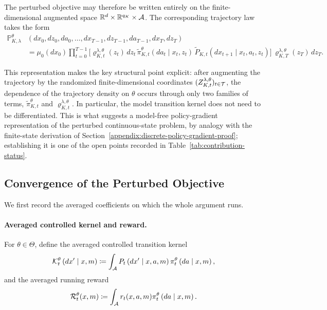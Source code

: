The perturbed objective may therefore be written entirely on the finite-dimensional augmented space $\mathbb{R}^d \times \mathbb{R}^{q_K} \times {\cal A}$. The corresponding trajectory law takes the form
\begin{align}
    \mathbb P_{K,\lambda}^{\theta} &(dx_0,dz_0,da_0,\ldots, dx_{T-1},dz_{T-1},da_{T-1},dx_T,dz_T) \nonumber\\ &= \mu_0(dx_0) \prod_{t=0}^{T-1} \Big[ \varrho_{K,t}^{\lambda,\theta}(z_t)\,dz_t\, \widetilde\pi_{K,t}^{\theta}(da_t\mid x_t,z_t)\, \widetilde P_{K,t}(dx_{t+1}\mid x_t,a_t,z_t) \Big] \, \varrho_{K,T}^{\lambda,\theta}(z_T)\,dz_T.
    \label{eq:gmm-augmented-trajectory-law}
\end{align}

This representation makes the key structural point explicit: after augmenting the trajectory by the randomized finite-dimensional coordinates $(Z_{K,t}^{\lambda,\theta})_{t\in{\cal T}}$, the dependence of the trajectory density on $\theta$ occurs through only two families of terms, $\widetilde\pi_{K,t}^{\theta}$ and $\varrho_{K,t}^{\lambda,\theta}$. In particular, the model transition kernel does not need to be differentiated. This is what suggests a model-free policy-gradient representation of the perturbed continuous-state problem, by analogy with the finite-state derivation of Section~\ref{appendix:discrete-policy-gradient-proof}; establishing it is one of the open points recorded in Table~\ref{tab:contribution-status}.

\subsection{Convergence of the Perturbed Objective}
\label{appendix:gmm-objective-convergence-proofs}

We first record the averaged coefficients on which the whole argument runs.

\paragraph{Averaged controlled kernel and reward.}

For $\theta\in\Theta$, define the averaged controlled transition kernel
\begin{align}
    {\cal K}_t^\theta\left( dx' \mid x,m \right) \coloneqq \int_{{\cal A}} P_t \left( dx' \mid x,a,m \right) \pi_t^\theta \left( da \mid x,m \right),
    \label{eq:gmm-averaged-kernel}
\end{align}
and the averaged running reward
\begin{align}
    {\cal R}_t^\theta(x,m) \coloneqq \int_{{\cal A}} r_t(x,a,m) \pi_t^\theta \left( da \mid x,m \right).
    \label{eq:gmm-averaged-reward}
\end{align}

